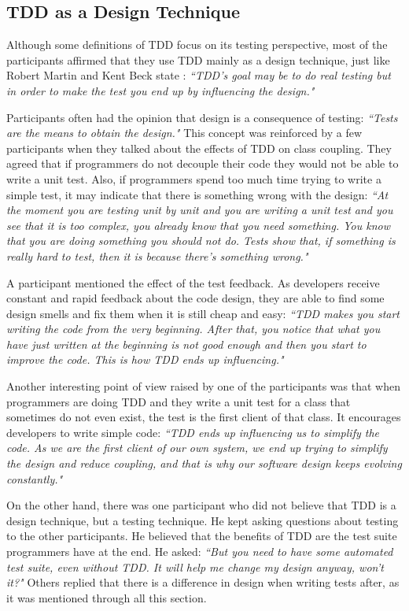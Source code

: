 \subsection{TDD as a Design Technique}

Although some definitions of TDD focus on its testing perspective, most of the
participants affirmed that they use TDD mainly as a design technique, just like
Robert Martin \cite{bob-martin} and Kent Beck state \cite{aim-fire}
\cite{tdd-by-example}: \textit{``TDD's goal may be to do real testing but in
order to make the test you end up by influencing the design."}

Participants often had the opinion that design is a consequence of testing: 
\textit{``Tests are the means to obtain the design."}
This concept was reinforced by a few participants when they talked about the
effects of TDD on class coupling. They agreed that if programmers do not
decouple their code they would not be able to write a unit test. Also, if
programmers spend too much time trying to write a simple test, it may
indicate that there is something wrong with the design: \textit{``At the moment
you are testing unit by unit and you are writing a unit test and you see that
it is too complex, you already know that you need something. You know that you
are doing something you should not do. Tests show that, if something is really
hard to test, then it is because there's something wrong."}

A participant mentioned the effect of the test feedback. 
As developers receive constant and rapid feedback about the code design,
they are able to find some design smells and fix them when it is still cheap and
easy:
\textit{``TDD makes you start writing the code from the very beginning. After
that, you notice that what you have just written at the beginning is not good
enough and then you start to improve the code. This is how TDD ends up
influencing."}

Another interesting point of view raised by one of the participants was that
when programmers are doing TDD and they write a unit test for a class that
sometimes do not even exist, the test is the first client of that class. It
encourages developers to write simple code:
 \textit{``TDD ends up influencing us to simplify the code. As we are the
first client of our own system, we end up trying to simplify the design and
reduce coupling, and that is why our software design keeps evolving
constantly."}

On the other hand, there was one participant who did not believe that TDD is a
design technique, but a testing technique. He kept asking questions about
testing to the other participants. He believed that the benefits of TDD are the
test suite programmers have at the end. He asked: \textit{``But you need to
have some automated test suite, even without TDD. It will help me change my
design anyway, won't it?"}
Others replied that there is a difference in design when writing tests after,
as it was mentioned through all this section.

